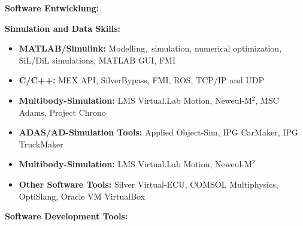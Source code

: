 \documentclass{mycv}
\begin{document}
\begin{paracol}{2}
{        {\bfseries Software Entwicklung:}\par
    }
    {
        {\bfseries Simulation and Data Skills:}
        \begin{itemize}
            \item {\bfseries MATLAB/Simulink:} Modelling, \,simulation,
                numerical optimization, SiL/DiL simulations, MATLAB GUI, FMI
            \item {\bfseries C/C++:} MEX API, SilverBypass, FMI, ROS, TCP/IP and UDP
            \item{\bfseries Multibody-Simulation:}  LMS Virtual.Lab Motion, Neweul-M$^2$, 
                MSC Adams, Project Chrono
            \item{\bfseries ADAS/AD-Simulation Tools:}  Applied Object-Sim, IPG CarMaker, IPG TruckMaker
            \item{\bfseries Multibody-Simulation:}  LMS Virtual.Lab Motion, Neweul-M$^2$
            \item {\bfseries Other Software Tools:}  Silver Virtual-ECU, COMSOL
                Multiphysics, OptiSlang, Oracle VM VirtualBox
        \end{itemize} \par

        {\bfseries Software Development Tools:}\par
    }


\end{paracol}
\end{document}
